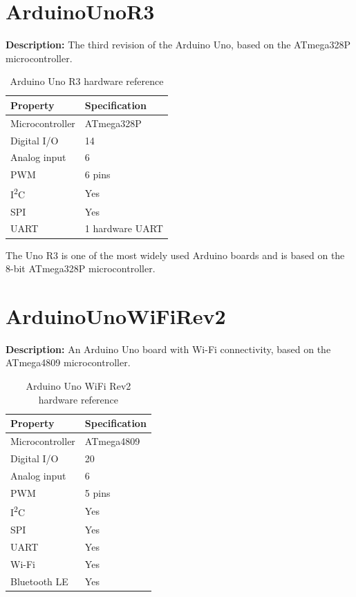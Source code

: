 \section{ArduinoUnoR3}

\textbf{Description:} The third revision of the Arduino Uno, based on the
ATmega328P microcontroller.

\begin{table}[H]
\centering
\caption{Arduino Uno R3 hardware reference}
\label{tab:board-uno-r3}
\begin{tabular}{ll}
\toprule
\textbf{Property} & \textbf{Specification} \\
\midrule
Microcontroller & ATmega328P \\
Digital I/O & 14 \\
Analog input & 6 \\
PWM & 6 pins \\
I\textsuperscript{2}C & Yes \\
SPI & Yes \\
UART & 1 hardware UART \\
\bottomrule
\end{tabular}
\end{table}

The Uno R3 is one of the most widely used Arduino boards and is based on
the 8-bit ATmega328P microcontroller.

\section{ArduinoUnoWiFiRev2}

\textbf{Description:} An Arduino Uno board with Wi-Fi connectivity, based
on the ATmega4809 microcontroller.

\begin{table}[H]
\centering
\caption{Arduino Uno WiFi Rev2 hardware reference}
\label{tab:board-uno-wifi}
\begin{tabular}{ll}
\toprule
\textbf{Property} & \textbf{Specification} \\
\midrule
Microcontroller & ATmega4809 \\
Digital I/O & 20 \\
Analog input & 6 \\
PWM & 5 pins \\
I\textsuperscript{2}C & Yes \\
SPI & Yes \\
UART & Yes \\
Wi-Fi & Yes \\
Bluetooth LE & Yes \\
\bottomrule
\end{tabular}
\end{table}

